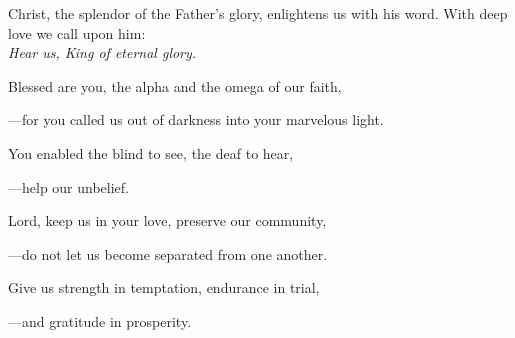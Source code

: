 \intercessions\indent

\begin{hangpar}

Christ, the splendor of the Father’s glory, enlightens us with his word. With deep love we call upon him:\\
\emph{Hear us, King of eternal glory.}

\medskip Blessed are you, the alpha and the omega of our faith,

{\color{red}---\thinspace}for you called us out of darkness into your marvelous light.

\medskip You enabled the blind to see, the deaf to hear,

{\color{red}---\thinspace}help our unbelief.

\medskip Lord, keep us in your love, preserve our community,

{\color{red}---\thinspace}do not let us become separated from one another.

\medskip Give us strength in temptation, endurance in trial,

{\color{red}---\thinspace}and gratitude in prosperity.

\end{hangpar}

